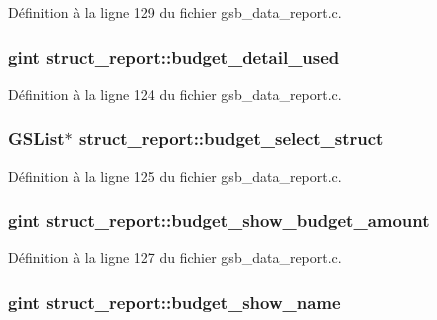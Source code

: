 Définition à la ligne 129 du fichier gsb\_\-data\_\-report.c.

\subsubsection[{budget\_\-detail\_\-used}]{\setlength{\rightskip}{0pt plus 5cm}gint {\bf struct\_\-report::budget\_\-detail\_\-used}}\label{structstruct__report_a4ef1c001999c752d0c11db81a27b8dde}


Définition à la ligne 124 du fichier gsb\_\-data\_\-report.c.

\subsubsection[{budget\_\-select\_\-struct}]{\setlength{\rightskip}{0pt plus 5cm}GSList$\ast$ {\bf struct\_\-report::budget\_\-select\_\-struct}}\label{structstruct__report_a7dcc1abb1c0cc021a8b9734e0a06d194}


Définition à la ligne 125 du fichier gsb\_\-data\_\-report.c.

\subsubsection[{budget\_\-show\_\-budget\_\-amount}]{\setlength{\rightskip}{0pt plus 5cm}gint {\bf struct\_\-report::budget\_\-show\_\-budget\_\-amount}}\label{structstruct__report_ac35c7c1eb978ea24548ccd128c3a68d2}


Définition à la ligne 127 du fichier gsb\_\-data\_\-report.c.

\subsubsection[{budget\_\-show\_\-name}]{\setlength{\rightskip}{0pt plus 5cm}gint {\bf struct\_\-report::budget\_\-show\_\-name}}\label{structstruct__report_aba27c0f34d3637a074a026737dac4460}


